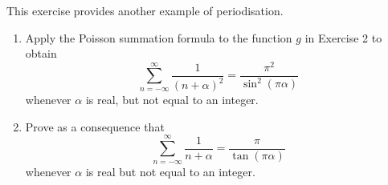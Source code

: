 \documentclass[12 pt, letterpaper]{hmcpset}
\begin{document}
\begin{problem}[S \& S \S 5.5 \#15.]
	This exercise provides another example of periodisation.
	\begin{enumerate}
		\item Apply the Poisson summation formula to the function $g$ in Exercise 2 to obtain
			\[
				\sum_{n = -\infty}^{\infty} \frac{1}{(n + \alpha)^{2}} = \frac{\pi^{2}}{\sin^{2}{(\pi \alpha)}}
			\]
			whenever $\alpha$ is real, but not equal to an integer.

		\item Prove as a consequence that
			\[
				\sum_{n = -\infty}^{\infty} \frac{1}{n + \alpha} = \frac{\pi}{\tan{(\pi \alpha)}}
			\]
			whenever $\alpha$ is real but not equal to an integer.
	\end{enumerate}
\end{problem}
\end{document}

